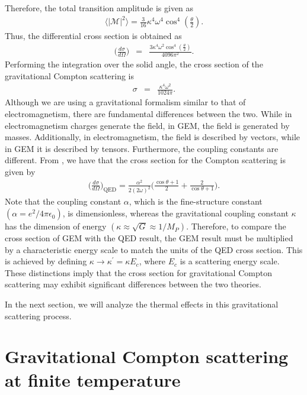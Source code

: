 \documentclass[11pt,showpacs,preprintnumbers,amsmath,amssymb,prd,nofootinbib,superscriptaddress]{revtex4-2}
\begin{document}
Therefore, the total transition amplitude is given as
\begin{eqnarray}
    \langle|\mathcal{M}|^2\rangle=\frac{3}{16} \kappa ^4 \omega ^4 \cos ^4\left(\frac{\theta }{2}\right).
\end{eqnarray}
Thus, the differential cross section is obtained as
\begin{eqnarray}
    \Big(\frac{d\sigma}{d\Omega}\Big)&=&\frac{3 \kappa ^4 \omega ^2 \cos ^4\left(\frac{\theta }{2}\right)}{4096 \pi ^2}.\label{44}
\end{eqnarray}
Performing the integration over the solid angle, the cross section of the gravitational Compton scattering is
\begin{eqnarray}
     \sigma&=&\frac{\kappa^4\omega^2}{1024\pi}.
\end{eqnarray}
Although we are using a gravitational formalism similar to that of electromagnetism, there are fundamental differences between the two. While in electromagnetism charges generate the field, in GEM, the field is generated by masses. Additionally, in electromagnetism, the field is described by vectors, while in GEM it is described by tensors. Furthermore, the coupling constants are different. From \cite{cabral}, we have that the cross section for the Compton scattering is given by
\begin{eqnarray}
		\bigg(\frac{d\sigma}{d\Omega}\bigg)_{\text{QED}}=\frac{\alpha^2}{2(2\omega)^2}\bigg(\frac{\cos\theta+1}{2}+\frac{2}{\cos\theta+1}\bigg).
\end{eqnarray}
Note that the coupling constant $\alpha$, which is the fine-structure constant $(\alpha = e^2 / 4\pi\epsilon_0)$, is dimensionless, whereas the gravitational coupling constant $\kappa$ has the dimension of energy $(\kappa \approx \sqrt{G} \approx 1/M_P)$.  Therefore, to compare the cross section of GEM with the QED result, the GEM result must be multiplied by a characteristic energy scale to match the units of the QED cross section. This is achieved by defining $\kappa \to \kappa^\prime = \kappa E_c$, where $E_c$ is a scattering energy scale. These distinctions imply that the cross section for gravitational Compton scattering may exhibit significant differences between the two theories.

In the next section, we will analyze the thermal effects in this gravitational scattering process.

\section{Gravitational Compton scattering at finite temperature} \label{IV}
\end{document}
